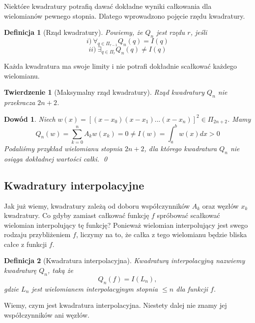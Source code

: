 \documentclass{article}
\newtheorem{defi}{Definicja}
\newtheorem{twr}{Twierdzenie}
\newtheorem*{dd}{Dowód}
\begin{document}
Niektóre kwadratury potrafią dawać dokładne wyniki całkowania dla wielomianów pewnego stopnia.
Dlatego wprowadzono pojęcie rzędu kwadratury.
\begin{defi}[Rząd kwadratury]
	Powiemy, że $Q_n$ jest rzędu $r$, jeśli
	\begin{equation*}
		i) \ \forall_{q \in \Pi_{r-1}} Q_n(q) = I(q)
	\end{equation*}
	\begin{equation*}
		ii) \ \exists_{q \in \Pi_r} Q_n(q) \neq I(q)
	\end{equation*}
\end{defi}
Każda kwadratura ma swoje limity i nie potrafi dokładnie scałkować każdego wielomianu.
\begin{twr}[Maksymalny rząd kwadratury]
	Rząd kwadratury $Q_n$ nie przekracza $2n + 2$.
\end{twr}
\begin{dd}
	\normalfont
	Niech $w(x) = [(x - x_0)(x - x_1) ... (x - x_n)]^2 \in \Pi_{2n + 2}$. Mamy
	\begin{equation*}
		Q_n(w) = \sum_{k = 0}^n A_k w(x_k) = 0 \neq I(w) = \int_a^b w(x) dx > 0
	\end{equation*}
	Podaliśmy przykład wielomianu stopnia $2n + 2$, dla którego kwadratura $Q_n$ nie osiąga dokładnej wartości całki.
	\qed
\end{dd}


\subsection{Kwadratury interpolacyjne}
Jak już wiemy, kwadratury zależą od doboru współczynników ${A_k}$ oraz węzłów ${x_k}$ kwadratury.
Co gdyby zamiast całkować funkcję $f$ spróbować scałkować wielomian interpolujący tę funkcję?
Ponieważ wielomian interpolujący jest swego rodzaju przybliżeniem $f$, liczymy na to, że całka z tego wielomianu będzie bliska całce z funkcji $f$.
\begin{defi}[Kwadratura interpolacyjna]
	Kwadraturą interpolacyjną nazwiemy kwadraturę $Q_n$, taką że
	\begin{equation*}
		Q_n(f) = I(L_n),
	\end{equation*}
	gdzie $L_n$ jest wielomianem interpolacyjnym stopnia $\leq n$ dla funkcji $f$.
\end{defi}
Wiemy, czym jest kwadratura interpolacyjna. Niestety dalej nie znamy jej współczynników ani węzłów.
\end{document}

